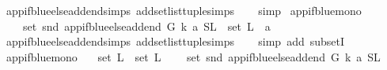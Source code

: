 \begin{isabellebody}
\ app{\isacharunderscore}{\kern0pt}if{\isacharunderscore}{\kern0pt}blue{\isacharunderscore}{\kern0pt}else{\isacharunderscore}{\kern0pt}add{\isacharunderscore}{\kern0pt}end{\isachardot}{\kern0pt}simps\ add{\isacharunderscore}{\kern0pt}set{\isacharunderscore}{\kern0pt}list{\isacharunderscore}{\kern0pt}tuple{\isachardot}{\kern0pt}simps\isanewline
\ \ \isamarkupfalse%
\ simp%
\endisatagproof
{\isafoldproof}%
%
\isadelimproof
\isanewline
%
\endisadelimproof
\isanewline
{}\isamarkupfalse%
\ app{\isacharunderscore}{\kern0pt}if{\isacharunderscore}{\kern0pt}blue{\isacharunderscore}{\kern0pt}mono{}{\isacharcolon}{\kern0pt}\isanewline
\ \ \ \ {\isachardoublequoteopen}set\ {\isacharparenleft}{\kern0pt}snd\ {\isacharparenleft}{\kern0pt}app{\isacharunderscore}{\kern0pt}if{\isacharunderscore}{\kern0pt}blue{\isacharunderscore}{\kern0pt}else{\isacharunderscore}{\kern0pt}add{\isacharunderscore}{\kern0pt}end\ G\ k\ a\ {\isacharparenleft}{\kern0pt}S{\isacharcomma}{\kern0pt}L{\isacharparenright}{\kern0pt}{\isacharparenright}{\kern0pt}{\isacharparenright}{\kern0pt}\ {\isasymsubseteq}\ set\ L\ {\isasymunion}\ {\isacharbraceleft}{\kern0pt}a{\isacharbraceright}{\kern0pt}{\isachardoublequoteclose}\isanewline
%
\isadelimproof
\ \ %
\endisadelimproof
%
\isatagproof
{}\isamarkupfalse%
\ app{\isacharunderscore}{\kern0pt}if{\isacharunderscore}{\kern0pt}blue{\isacharunderscore}{\kern0pt}else{\isacharunderscore}{\kern0pt}add{\isacharunderscore}{\kern0pt}end{\isachardot}{\kern0pt}simps\ add{\isacharunderscore}{\kern0pt}set{\isacharunderscore}{\kern0pt}list{\isacharunderscore}{\kern0pt}tuple{\isachardot}{\kern0pt}simps\isanewline
\ \ \isamarkupfalse%
\ {\isacharparenleft}{\kern0pt}simp\ add{\isacharcolon}{\kern0pt}\ subsetI{\isacharparenright}{\kern0pt}%
\endisatagproof
{\isafoldproof}%
%
\isadelimproof
\isanewline
%
\endisadelimproof
\isanewline
{}\isamarkupfalse%
\ app{\isacharunderscore}{\kern0pt}if{\isacharunderscore}{\kern0pt}blue{\isacharunderscore}{\kern0pt}mono{}{\isacharcolon}{\kern0pt}\isanewline
\ \ \ {\isachardoublequoteopen}set\ L{}\ {\isasymsubseteq}\ set\ L{}{\isachardoublequoteclose}\isanewline
\ \ \ \ {\isachardoublequoteopen}set\ {\isacharparenleft}{\kern0pt}snd\ {\isacharparenleft}{\kern0pt}app{\isacharunderscore}{\kern0pt}if{\isacharunderscore}{\kern0pt}blue{\isacharunderscore}{\kern0pt}else{\isacharunderscore}{\kern0pt}add{\isacharunderscore}{\kern0pt}end\ G\ k\ a\ {\isacharparenleft}{\kern0pt}S{\isacharcomma}{\kern0pt}L{}{\isacharparenright}{\kern0pt}{\isacharparenright}{\kern0pt}{\isacharparenright}{\kern0pt}\isanewline

\end{isabellebody}
